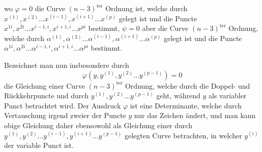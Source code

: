 \documentclass[10pt]{article}
\begin{document}
\endgroup
wo \(\varphi=0\) die Curve \((n-3)^{\mathrm{ter}}\) Ordnung ist, welche durch \(x^{(1)},x^{(2)}\ldots x^{(i-1)},x^{(i+1)}\ldots x^{(p)}\) gelegt ist und die Puncte \(x^{1i},x^{2i}\ldots x^{i-1,i},x^{i+1,i}\ldots x^{pi}\) bestimmt, \(\psi=0\) aber die Curve \((n-3)^{\mathrm{ter}}\) Ordnung, welche durch \(\alpha^{(1)},\alpha^{(2)}\ldots\alpha^{(i-1)},\alpha^{(i+1)}\ldots\alpha^{(p)}\) gelegt ist und die Puncte \(\alpha^{1i},\alpha^{2i}\ldots\alpha^{i-1,i},\alpha^{i+1,i}\ldots\alpha^{pi}\) bestimmt.

Bezeichnet man nun insbesondere durch
\[
\varphi(y,y^{(1)},y^{(2)}\ldots y^{(p-1)})=0
\]
die Gleichung einer Curve \((n-3)^{\mathrm{ter}}\) Ordnung, welche durch die Doppel- und Rückkehrpuncte und durch \(y^{(1)},y^{(2)}\ldots y^{(p-1)}\) geht, während \(y\) als variabler Punct betrachtet wird. Der Ausdruck \(\varphi\) ist eine Determinante, welche durch Vertauschung irgend zweier der Puncte \(y\) nur das Zeichen ändert, und man kann obige Gleichung daher ebensowohl als Gleichung einer durch \(y^{(1)},y^{(2)}\ldots y^{(i-1)},y^{(i+1)}\ldots y^{(p-1)}\) gelegten Curve betrachten, in welcher \(y^{(i)}\) der variable Punct ist.
\end{document}
